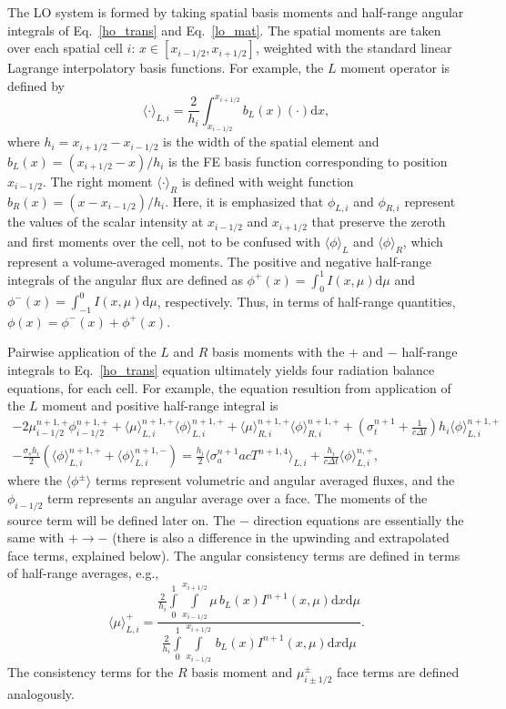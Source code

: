 \documentclass{mc2013}
\renewcommand{\d}{\mathrm{d}}
\newcommand{\mom}[1]{\langle #1 \rangle}
\newcommand{\xl}{{x_{i-1/2}}}
\newcommand{\xr}{{x_{i+1/2}}}
\newcommand{\il}{{i-1/2}}
\newcommand{\ir}{{i+1/2}}
\begin{document}
The LO system is formed by taking spatial basis moments and half-range angular
integrals of Eq.~\eqref{ho_trans} and Eq.~\eqref{lo_mat}. The spatial moments are taken over each spatial cell $i$:
$x\in[x_{i-1/2},x_{i+1/2}]$, weighted with the standard linear Lagrange
interpolatory basis functions.  For example, the $L$  moment operator is defined by
\begin{equation}\label{x_mom}
\mom{\cdot}_{L,i} = \frac{2}{h_i} \int_{x_{i-1/2}}^{\xr} b_L(x) (\cdot) \d x,
\end{equation}
where $h_i=x_{i+1/2}-x_{i-1/2}$ is the width of the spatial element and
$b_L(x)=(x_{i+1/2}-x)/h_i$ is the FE basis function corresponding to position
$x_{i-1/2}$.  The right moment $\mom{\cdot}_R$ is defined with weight function $b_R(x)=(x -
x_{i-1/2})/h_i$.  Here, it is emphasized that $\phi_{L,i}$ and $\phi_{R,i}$ represent
the values of the scalar intensity at $x_\il$ and $x_\ir$ that preserve the zeroth
and first moments over the cell, not to be confused with $\mom{\phi}_L$ and
$\mom{\phi}_R$, which
represent a volume-averaged moments.
The positive and negative half-range integrals of the angular flux are defined as
$ \phi^+(x) = \int_0^{1} I(x,\mu) \d \mu$ and $ \phi^-(x) = \int_{-1}^{0} I(x,\mu) \d
\mu$, respectively.  Thus, in terms of half-range quantities, $\phi(x) = \phi^-(x) + \phi ^+(x)$.  

Pairwise application of the $L$ and $R$ basis
moments with the $+$ and $-$ half-range integrals to Eq.~\eqref{ho_trans} equation
ultimately yields four radiation balance
equations, for each cell.  For example, the equation resultion from application of the $L$ moment and
positive half-range integral is
\begin{multline}\label{lo_tran}
    -2{\mu}_{i-1/2}^{n+1,+} \phi_{i-1/2}^{n+1,+} + \mom {\mu}_{L,i}^{n+1,+}
  \mom{\phi}_{L,i}^{n+1,+}
  +  \mom\mu_{R,i}^{n+1,+}
  \mom{\phi}_{R,i}^{n+1,+} +  \left(\sigma_t^{n+1}+\frac{1}{c \Delta t} \right) h_i 
  \mom{\phi}_{L,i}^{n+1,+} \\-  \frac{\sigma_s h_i}{2} \left( \mom{\phi}_{L,i}^{n+1,+} +
  \mom\phi_{L,i}^{n+1,-}\right) = \frac{h_i}{2} \mom{\sigma_a^{n+1} a c T^{n+1,4}}_{L,i} +
  \frac{h_i}{c\Delta t}\mom{\phi}_{L,i}^{n,+},
\end{multline}
where the $\mom{\phi^\pm}$ terms represent volumetric and angular averaged fluxes,
and the $\phi_{i-1/2}$ term represents an angular average over a face.  The moments
of the source term will be defined later on. The $-$ direction equations are
essentially the same with $+ \rightarrow -$ (there is also
a difference in the upwinding and extrapolated face terms, explained below). 
The angular consistency terms are defined in terms of half-range averages, e.g.,
\begin{equation}\label{const}
\mom{{\mu}}_{L,i}^+ =  \frac{
{\displaystyle \frac{2}{h_i}} \int\limits_0^1 \int\limits_\xl^\xr \mu \, b_L(x)
I^{n+1}(x,\mu) \d x \d \mu } 
{{\displaystyle \frac{2}{h_i}} \int\limits_0^1 \int\limits_\xl^\xr \, b_L(x)
I^{n+1}(x,\mu) \d x \d \mu } .
\end{equation}
The consistency terms for the $R$ basis moment and $\mu_{i\pm1/2}^\pm$ face
terms are defined analogously. 
\end{document}
